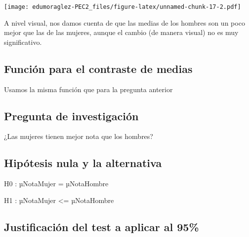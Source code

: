 \documentclass[
]{article}
\newenvironment{Shaded}{\begin{snugshade}}{\end{snugshade}}
\newcommand{\CommentTok}[1]{\textcolor[rgb]{0.50,0.62,0.50}{#1}}
\newcommand{\ConstantTok}[1]{\textcolor[rgb]{0.86,0.64,0.64}{\textbf{#1}}}
\newcommand{\FunctionTok}[1]{\textcolor[rgb]{0.94,0.94,0.56}{#1}}
\newcommand{\NormalTok}[1]{\textcolor[rgb]{0.80,0.80,0.80}{#1}}
\newcommand{\SpecialCharTok}[1]{\textcolor[rgb]{0.86,0.64,0.64}{#1}}
\begin{document}
\texttt{[image: edumoraglez-PEC2\_files/figure-latex/unnamed-chunk-17-2.pdf]}

A nivel visual, nos damos cuenta de que las medias de los hombres son un
poco mejor que las de las mujeres, aunque el cambio (de manera visual)
no es muy significativo.

\hypertarget{funciuxf3n-para-el-contraste-de-medias-1}{%
\subsection{Función para el contraste de
medias}\label{funciuxf3n-para-el-contraste-de-medias-1}}

Usamos la misma función que para la pregunta anterior

\hypertarget{pregunta-de-investigaciuxf3n-1}{%
\subsection{Pregunta de
investigación}\label{pregunta-de-investigaciuxf3n-1}}

¿Las mujeres tienen mejor nota que los hombres?

\hypertarget{hipuxf3tesis-nula-y-la-alternativa-1}{%
\subsection{Hipótesis nula y la
alternativa}\label{hipuxf3tesis-nula-y-la-alternativa-1}}

H0 : µNotaMujer = µNotaHombre

H1 : µNotaMujer \textless= µNotaHombre

\hypertarget{justificaciuxf3n-del-test-a-aplicar-al-95}{%
\subsection{Justificación del test a aplicar al
95\%}\label{justificaciuxf3n-del-test-a-aplicar-al-95}}

\begin{Shaded}
\end{Shaded}
\end{document}
